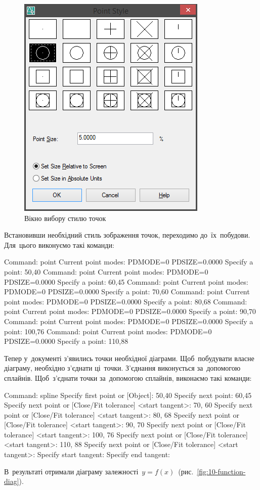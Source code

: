 \documentclass[
	a4paper,
	oneside,
	BCOR = 10mm,
	DIV = 12,
	12pt,
	headings = normal,
]{scrartcl}
\begin{document}
			\begin{figure}[!htbp]
				\centering
				\includegraphics[height=12\baselineskip]{./assets/y04s01-csdt-lab-01-01-p11.png}
				\caption{Вікно вибору стилю точок}
				\label{fig:09-point-style}
			\end{figure}

			Встановивши необхідний стиль зображення точок, переходимо до~їх~побудови. Для~цього виконуємо такі команди:
			\begin{codegeneric}
				Command: point
				Current point modes:  PDMODE=0  PDSIZE=0.0000
				Specify a point: 50,40
				Command: point
				Current point modes:  PDMODE=0  PDSIZE=0.0000
				Specify a point: 60,45
				Command: point
				Current point modes:  PDMODE=0  PDSIZE=0.0000
				Specify a point: 70,60
				Command: point
				Current point modes:  PDMODE=0  PDSIZE=0.0000
				Specify a point: 80,68
				Command: point
				Current point modes:  PDMODE=0  PDSIZE=0.0000
				Specify a point: 90,70
				Command: point
				Current point modes:  PDMODE=0  PDSIZE=0.0000
				Specify a point: 100,76
				Command: point
				Current point modes:  PDMODE=0  PDSIZE=0.0000
				Specify a point: 110,88
			\end{codegeneric}
			Тепер у~документі з'явились точки необхідної діаграми. Щоб~побудувати власне діаграму, необхідно з'єднати ці~точки. З'єднання виконується за~допомогою сплайнів. Щоб~з'єднати точки за~допомогою сплайнів, виконаємо такі команди:
			\begin{codegeneric}
				Command: spline
				Specify first point or [Object]: 50,40
				Specify next point: 60,45
				Specify next point or [Close/Fit tolerance] <start tangent>: 70, 60
				Specify next point or [Close/Fit tolerance] <start tangent>: 80, 68
				Specify next point or [Close/Fit tolerance] <start tangent>: 90, 70
				Specify next point or [Close/Fit tolerance] <start tangent>: 100, 76
				Specify next point or [Close/Fit tolerance] <start tangent>: 110, 88
				Specify next point or [Close/Fit tolerance] <start tangent>:
				Specify start tangent:
				Specify end tangent:
			\end{codegeneric}
			В~результаті отримали діаграму залежності~$y = f(x)$~(рис.~\ref{fig:10-function-diag}).
\end{document}
